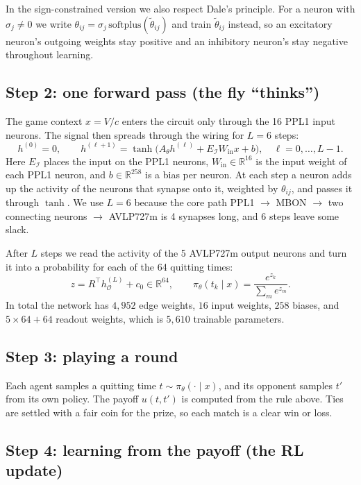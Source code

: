 \documentclass{article}
\newcommand{\R}{\mathbb{R}}
\newcommand{\In}{\mathcal{I}}
\newcommand{\Out}{\mathcal{O}}
\begin{document}
In the sign-constrained version we also respect Dale's principle. For a neuron with $\sigma_j \ne 0$ we write $\theta_{ij} = \sigma_j\, \mathrm{softplus}(\tilde\theta_{ij})$ and train $\tilde\theta_{ij}$ instead, so an excitatory neuron's outgoing weights stay positive and an inhibitory neuron's stay negative throughout learning.

\subsection{Step 2: one forward pass (the fly ``thinks'')}

The game context $x = V/c$ enters the circuit only through the 16 PPL1 input neurons. The signal then spreads through the wiring for $L = 6$ steps:
\[
h^{(0)} = 0,\qquad
h^{(\ell+1)} = \tanh\!\big(A_\theta h^{(\ell)} + E_{\In} W_{\mathrm{in}} x + b\big), \quad \ell = 0,\dots,L-1.
\]
Here $E_{\In}$ places the input on the PPL1 neurons, $W_{\mathrm{in}} \in \R^{16}$ is the input weight of each PPL1 neuron, and $b \in \R^{258}$ is a bias per neuron. At each step a neuron adds up the activity of the neurons that synapse onto it, weighted by $\theta_{ij}$, and passes it through $\tanh$. We use $L = 6$ because the core path PPL1 $\to$ MBON $\to$ two connecting neurons $\to$ AVLP727m is 4 synapses long, and 6 steps leave some slack.

After $L$ steps we read the activity of the 5 AVLP727m output neurons and turn it into a probability for each of the 64 quitting times:
\[
z = R^\top h^{(L)}_{\Out} + c_0 \in \R^{64},\qquad \pi_\theta(t_k \mid x) = \frac{e^{z_k}}{\sum_{m} e^{z_m}}.
\]
In total the network has $4{,}952$ edge weights, $16$ input weights, $258$ biases, and $5 \times 64 + 64$ readout weights, which is $5{,}610$ trainable parameters.

\subsection{Step 3: playing a round}

Each agent samples a quitting time $t \sim \pi_\theta(\cdot \mid x)$, and its opponent samples $t'$ from its own policy. The payoff $u(t,t')$ is computed from the rule above. Ties are settled with a fair coin for the prize, so each match is a clear win or loss.

\subsection{Step 4: learning from the payoff (the RL update)}
\end{document}
